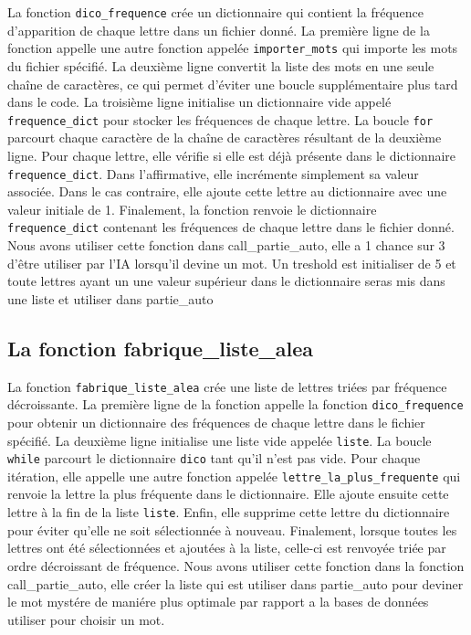 \documentclass{article}
\def\abc#1{\begingroup\escapechar-1 \expandafter\string\csname#1\endcsname\endgroup}
\begin{document}
La fonction \verb|dico_frequence| crée un dictionnaire qui contient la fréquence d'apparition de chaque lettre dans un fichier donné. La première ligne de la fonction appelle une autre fonction appelée \verb|importer_mots| qui importe les mots du fichier spécifié. La deuxième ligne convertit la liste des mots en une seule chaîne de caractères, ce qui permet d'éviter une boucle supplémentaire plus tard dans le code. La troisième ligne initialise un dictionnaire vide appelé \verb|frequence_dict| pour stocker les fréquences de chaque lettre. La boucle \verb|for| parcourt chaque caractère de la chaîne de caractères résultant de la deuxième ligne. Pour chaque lettre, elle vérifie si elle est déjà présente dans le dictionnaire \verb|frequence_dict|. Dans l'affirmative, elle incrémente simplement sa valeur associée. Dans le cas contraire, elle ajoute cette lettre au dictionnaire avec une valeur initiale de 1. Finalement, la fonction renvoie le dictionnaire \verb|frequence_dict| contenant les fréquences de
chaque lettre dans le fichier donné.
Nous avons utiliser cette fonction dans \abc{call_partie_auto}, elle a 1 chance sur 3 d'être utiliser par l'IA lorsqu'il devine un mot. Un treshold est initialiser de 5 et toute lettres ayant un une valeur supérieur dans le dictionnaire seras mis dans une liste et utiliser dans \abc{partie_auto}

\newpage

\subsection{La fonction \abc{fabrique_liste_alea}}

La fonction \verb|fabrique_liste_alea| crée une liste de lettres triées par fréquence décroissante. La première ligne de la fonction appelle la fonction \verb|dico_frequence| pour obtenir un dictionnaire des fréquences de chaque lettre dans le fichier spécifié. La deuxième ligne initialise une liste vide appelée \verb|liste|. La boucle \verb|while| parcourt le dictionnaire \verb|dico| tant qu'il n'est pas vide. Pour chaque itération, elle appelle une autre fonction appelée \verb|lettre_la_plus_frequente| qui renvoie la lettre la plus fréquente dans le dictionnaire. Elle ajoute ensuite cette lettre à la fin de la liste \verb|liste|. Enfin, elle supprime cette lettre du dictionnaire pour éviter qu'elle ne soit sélectionnée à nouveau. Finalement, lorsque toutes les lettres ont été sélectionnées et ajoutées à la liste, celle-ci est renvoyée triée par ordre décroissant de fréquence.
Nous avons utiliser cette fonction dans la fonction \abc{call_partie_auto}, elle créer la liste qui est utiliser dans \abc{partie_auto} pour deviner le mot mystére de maniére plus optimale par rapport a la bases de données utiliser pour choisir un mot.
\end{document}
